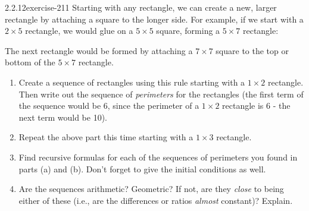 \documentclass[twoside,11pt,]{book}
\numberwithin{equation}{chapter}
\begin{document}
\begin{divisionsolution}{2.2.12}{}{exercise-211}%
\hypertarget{p-3259}{}%
Starting with any rectangle, we can create a new, larger rectangle by attaching a square to the longer side. For example, if we start with a \(2\times 5\) rectangle, we would glue on a \(5\times 5\) square, forming a \(5 \times 7\) rectangle:%
\begin{sidebyside}{1}{0.2}{0.2}{0}%
\begin{sbspanel}{0.6}%
\end{sbspanel}%
\end{sidebyside}%
\par
\hypertarget{p-3260}{}%
The next rectangle would be formed by attaching a \(7 \times 7\) square to the top or bottom of the \(5\times 7\) rectangle. \leavevmode%
\begin{enumerate}[label=(\alph*)]
\item\hypertarget{li-1902}{}\hypertarget{p-3261}{}%
Create a sequence of rectangles using this rule starting with a \(1\times 2\) rectangle. Then write out the sequence of \emph{perimeters} for the rectangles (the first term of the sequence would be 6, since the perimeter of a \(1\times 2\) rectangle is 6 - the next term would be 10). %
\item\hypertarget{li-1903}{}\hypertarget{p-3262}{}%
Repeat the above part this time starting with a \(1 \times 3\) rectangle. %
\item\hypertarget{li-1904}{}\hypertarget{p-3263}{}%
Find recursive formulas for each of the sequences of perimeters you found in parts (a) and (b). Don't forget to give the initial conditions as well. %
\item\hypertarget{li-1905}{}\hypertarget{p-3264}{}%
Are the sequences arithmetic? Geometric? If not, are they \emph{close} to being either of these (i.e., are the differences or ratios \emph{almost} constant)? Explain. %
\end{enumerate}
%
\end{divisionsolution}%
\end{document}
